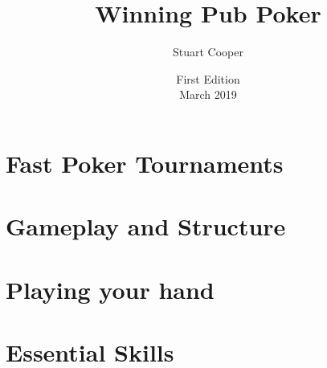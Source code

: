 \documentclass{book}
\begin{document}



\title{Winning Pub Poker}
\author{Stuart Cooper}
\date{First Edition\\March 2019}


\maketitle
\tableofcontents



\part{Fast Poker Tournaments}





\part{Gameplay and Structure}



\part{Playing your hand}




\part{Essential Skills}




% 






\end{document}
